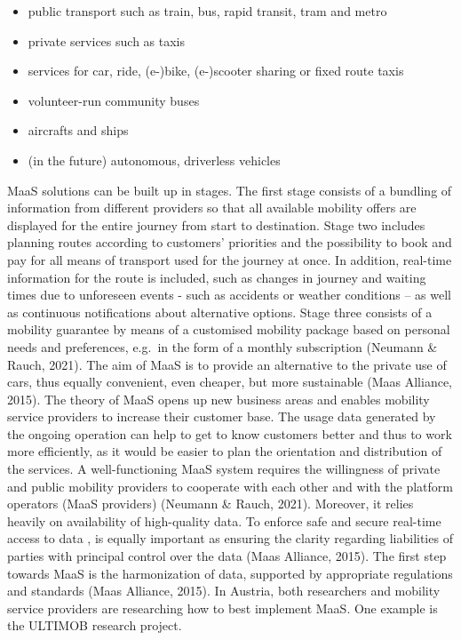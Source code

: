 \documentclass[
]{book}
\providecommand{\tightlist}{%
  \setlength{\itemsep}{0pt}\setlength{\parskip}{0pt}}
\begin{document}
\begin{itemize}
\tightlist
\item
  public transport such as train, bus, rapid transit, tram and metro
\item
  private services such as taxis
\item
  services for car, ride, (e-)bike, (e-)scooter sharing or fixed route taxis
\item
  volunteer-run community buses
\item
  aircrafts and ships
\item
  (in the future) autonomous, driverless vehicles
\end{itemize}

MaaS solutions can be built up in stages. The first stage consists of a bundling of information from different providers so that all available mobility offers are displayed for the entire journey from start to destination. Stage two includes planning routes according to customers' priorities and the possibility to book and pay for all means of transport used for the journey at once. In addition, real-time information for the route is included, such as changes in journey and waiting times due to unforeseen events - such as accidents or weather conditions -- as well as continuous notifications about alternative options. Stage three consists of a mobility guarantee by means of a customised mobility package based on personal needs and preferences, e.g.~in the form of a monthly subscription (Neumann \& Rauch, 2021).
The aim of MaaS is to provide an alternative to the private use of cars, thus equally convenient, even cheaper, but more sustainable (Maas Alliance, 2015). The theory of MaaS opens up new business areas and enables mobility service providers to increase their customer base. The usage data generated by the ongoing operation can help to get to know customers better and thus to work more efficiently, as it would be easier to plan the orientation and distribution of the services. A well-functioning MaaS system requires the willingness of private and public mobility providers to cooperate with each other and with the platform operators (MaaS providers) (Neumann \& Rauch, 2021). Moreover, it relies heavily on availability of high-quality data. To enforce safe and secure real-time access to data , is equally important as ensuring the clarity regarding liabilities of parties with principal control over the data (Maas Alliance, 2015). The first step towards MaaS is the harmonization of data, supported by appropriate regulations and standards (Maas Alliance, 2015). In Austria, both researchers and mobility service providers are researching how to best implement MaaS. One example is the ULTIMOB research project.
\end{document}
